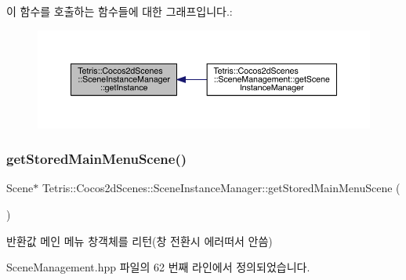 이 함수를 호출하는 함수들에 대한 그래프입니다.\+:
\nopagebreak
\begin{figure}[H]
\begin{center}
\leavevmode
\includegraphics[width=350pt]{class_tetris_1_1_cocos2d_scenes_1_1_scene_instance_manager_a0010e1efc6470cde661494631dc35b90_icgraph}
\end{center}
\end{figure}
\mbox{\label{class_tetris_1_1_cocos2d_scenes_1_1_scene_instance_manager_ac7f573b16a4fd8746fd1f397dbfd01c2}} 
\subsubsection{\texorpdfstring{get\+Stored\+Main\+Menu\+Scene()}{getStoredMainMenuScene()}}
{\footnotesize\ttfamily Scene$\ast$ Tetris\+::\+Cocos2d\+Scenes\+::\+Scene\+Instance\+Manager\+::get\+Stored\+Main\+Menu\+Scene (\begin{DoxyParamCaption}{ }\end{DoxyParamCaption})\hspace{0.3cm}{\ttfamily [inline]}}

\begin{DoxyReturn}{반환값}
메인 메뉴 창객체를 리턴(창 전환시 에러떠서 안씀) 
\end{DoxyReturn}


Scene\+Management.\+hpp 파일의 62 번째 라인에서 정의되었습니다.

